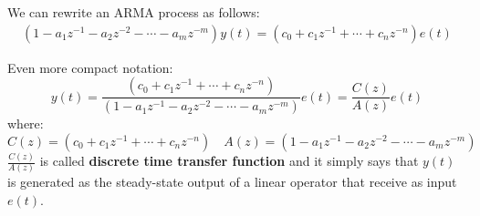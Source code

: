We can rewrite an ARMA process as follows:
\begin{align*}
	\left(1-a_{1} z^{-1}-a_{2} z^{-2}-\cdots-a_{m} z^{-m}\right) y(t)=\left(c_{0}+c_{1} z^{-1}+\cdots+c_{n} z^{-n}\right) e(t)
\end{align*}

Even more compact notation:
\[
	\boxed{y(t)=\frac{\left(c_{0}+c_{1} z^{-1}+\cdots+c_{n} z^{-n}\right)}{\left(1-a_{1} z^{-1}-a_{2} z^{-2}-\cdots-a_{m} z^{-m}\right)} e(t)=\frac{C(z)}{A(z)} e(t)}
\]
where:
\[
	\boxed{C(z)=\left(c_{0}+c_{1} z^{-1}+\cdots+c_{n} z^{-n}\right)} \quad \boxed{A(z)=\left(1-a_{1} z^{-1}-a_{2} z^{-2}-\cdots-a_{m} z^{-m}\right)}
\]
$\frac{C(z)}{A(z)}$ is called \textbf{discrete time transfer function} and it simply says that $y(t)$ is generated as the steady-state output of a linear operator that receive as input $e(t)$.